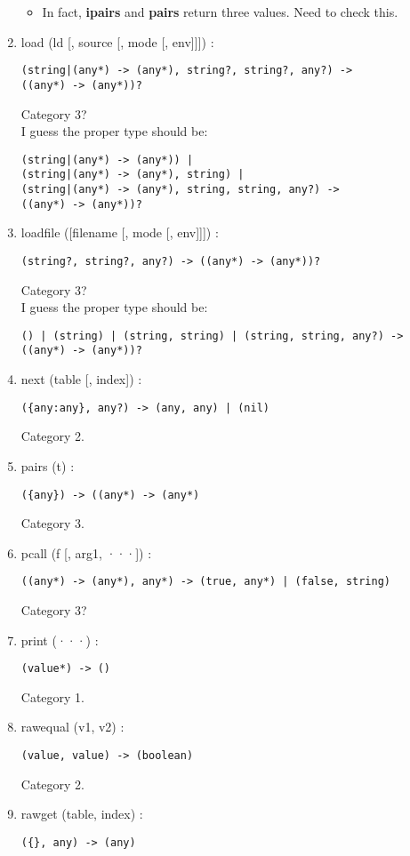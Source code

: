\documentclass{paper}
\begin{document}
\begin{enumerate}
\begin{itemize}
\item In fact, \textbf{ipairs} and \textbf{pairs} return three values.
Need to check this.
\end{itemize}
\item load (ld [, source [, mode [, env]]]) :
\begin{verbatim}
(string|(any*) -> (any*), string?, string?, any?) ->
((any*) -> (any*))?
\end{verbatim}
Category 3?
\\
I guess the proper type should be:
\begin{verbatim}
(string|(any*) -> (any*)) |
(string|(any*) -> (any*), string) |
(string|(any*) -> (any*), string, string, any?) ->
((any*) -> (any*))?
\end{verbatim}
\item loadfile ([filename [, mode [, env]]]) :
\begin{verbatim}
(string?, string?, any?) -> ((any*) -> (any*))?
\end{verbatim}
Category 3?
\\
I guess the proper type should be:
\begin{verbatim}
() | (string) | (string, string) | (string, string, any?) ->
((any*) -> (any*))?
\end{verbatim}
\item next (table [, index]) :
\begin{verbatim}
({any:any}, any?) -> (any, any) | (nil)
\end{verbatim}
Category 2.
\item pairs (t) :
\begin{verbatim}
({any}) -> ((any*) -> (any*)
\end{verbatim}
Category 3.
\item pcall (f [, arg1, ···]) :
\begin{verbatim}
((any*) -> (any*), any*) -> (true, any*) | (false, string)
\end{verbatim}
Category 3?
\item print (···) :
\begin{verbatim}
(value*) -> ()
\end{verbatim}
Category 1.
\item rawequal (v1, v2) :
\begin{verbatim}
(value, value) -> (boolean)
\end{verbatim}
Category 2.
\item rawget (table, index) :
\begin{verbatim}
({}, any) -> (any)
\end{verbatim}

\end{enumerate}
\end{document}
